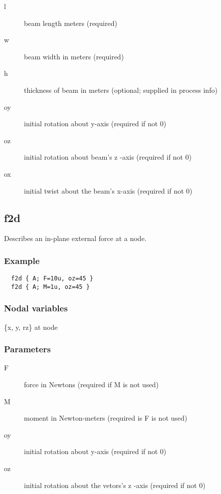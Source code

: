 \begin{description}
  \item[l]  beam length meters (required) 
  \item[w]  beam width in meters (required) 
  \item[h]  thickness of beam in meters (optional; supplied in process info) 
  \item[oy]  initial rotation about y-axis (required if not 0) 
  \item[oz]  initial rotation about beam's z -axis (required if not 0) 
  \item[ox]  initial twist about the beam's x-axis (required if not 0) 
\end{description}

\subsection{f2d}
 
Describes an in-plane external force at a node. 

\subsubsection*{Example}

\begin{verbatim}
  f2d { A; F=10u, oz=45 }
  f2d { A; M=1u, oz=45 }
\end{verbatim}
 
\subsubsection*{Nodal variables}

\{x, y, rz\} at node 
 
\subsubsection*{Parameters}

\begin{description}
 \item[F] force in Newtons (required if M is not used) 
 \item[M] moment in Newton-meters (required is F is not used) 
 \item[oy] initial rotation about y-axis (required if not 0) 
 \item[oz] initial rotation about the vetors's z -axis (required if not 0) 
\end{description}


